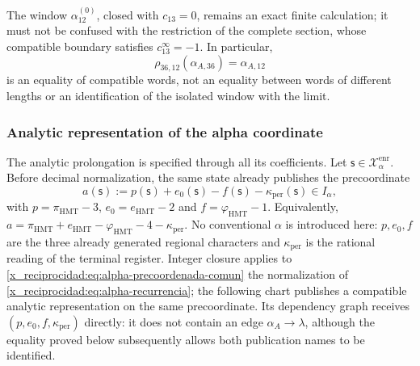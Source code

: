 The window \(\alpha_{12}^{(0)}\), closed with \(c_{13}=0\), remains an
exact finite calculation; it must not be confused with the restriction of the
complete section, whose compatible boundary satisfies \(c_{13}^{\infty}=-1\). In
particular,
\begin{equation}
 \rho_{36,12}(\alpha_{A,36})=\alpha_{A,12}
 \label{x_reciprocidad:eq:alpha-rho-36-12-proyectiva}
\end{equation}
is an equality of compatible words, not an equality between words of
different lengths or an identification of the isolated window with the
limit.



\subsubsection{Analytic representation of the alpha coordinate}
\label{x_reciprocidad:subsec:alpha-lector-completo-rev08}

The analytic prolongation is specified through all its coefficients.
Let \(\mathsf s\in\mathcal X_\alpha^{\mathrm{enr}}\). Before
decimal normalization, the same state already publishes the precoordinate
\begin{equation}
 a(\mathsf s):=p(\mathsf s)+e_0(\mathsf s)-f(\mathsf s)
                 -\kappa_{\mathrm{per}}(\mathsf s)\in I_\alpha,
 \label{x_reciprocidad:eq:alpha-precoordenada-comun}
\end{equation}
with \(p=\pi_{\mathrm{HMT}}-3\),
\(e_0=e_{\mathrm{HMT}}-2\) and
\(f=\varphi_{\mathrm{HMT}}-1\). Equivalently,
\(a=\pi_{\mathrm{HMT}}+e_{\mathrm{HMT}}-
\varphi_{\mathrm{HMT}}-4-\kappa_{\mathrm{per}}\). No conventional
\(\alpha\) is introduced here: \(p,e_0,f\) are the three already
generated regional characters and \(\kappa_{\mathrm{per}}\) is the rational reading of the
terminal register. Integer closure applies to
\eqref{x_reciprocidad:eq:alpha-precoordenada-comun} the normalization of
\eqref{x_reciprocidad:eq:alpha-recurrencia}; the following chart publishes a compatible analytic
representation on the same precoordinate. Its dependency
graph receives \((p,e_0,f,\kappa_{\mathrm{per}})\) directly: it does not
contain an edge \(\alpha_A\to\lambda\), although the equality proved
below subsequently allows both publication names to be identified.

